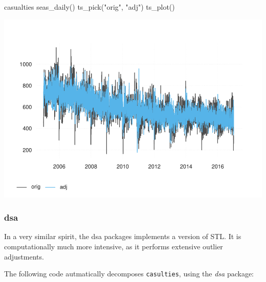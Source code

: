 \begin{Schunk}
\begin{Sinput}
casualties %
  seas_daily() %
  ts_pick("orig", "adj") %
  ts_plot()
\end{Sinput}

\includegraphics[width=1\linewidth]{overview_files/figure-latex/stl-1} \end{Schunk}

\hypertarget{dsa}{%
\subsubsection{dsa}\label{dsa}}

In a very similar spirit, the dsa packages implements a version of STL.
It is computationally much more intensive, as it performs extensive
outlier adjustments.

The following code autmatically decomposes \texttt{casulties}, using the
\emph{dsa} package:

